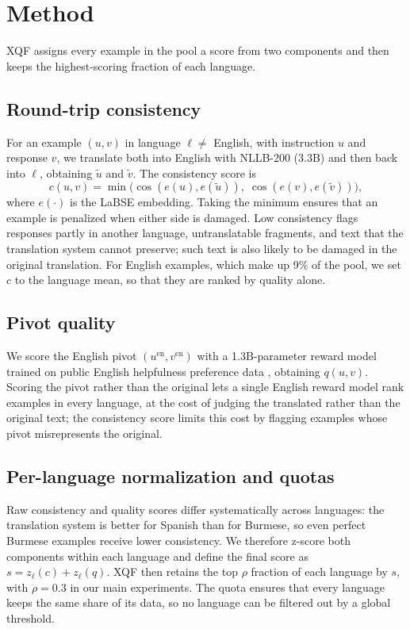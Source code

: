 \documentclass{article}
\begin{document}
\section{Method}
\label{sec:method}

XQF assigns every example in the pool a score from two components and then keeps the highest-scoring fraction of each language.

\subsection{Round-trip consistency}
For an example $(u, v)$ in language $\ell \neq$ English, with instruction $u$ and response $v$, we translate both into English with NLLB-200 (3.3B) and then back into $\ell$, obtaining $\tilde u$ and $\tilde v$. The consistency score is
\begin{equation}
c(u, v) = \min\big(\cos(e(u), e(\tilde u)),\; \cos(e(v), e(\tilde v))\big),
\end{equation}
where $e(\cdot)$ is the LaBSE embedding. Taking the minimum ensures that an example is penalized when either side is damaged. Low consistency flags responses partly in another language, untranslatable fragments, and text that the translation system cannot preserve; such text is also likely to be damaged in the original translation. For English examples, which make up 9\% of the pool, we set $c$ to the language mean, so that they are ranked by quality alone.

\subsection{Pivot quality}
We score the English pivot $(u^{\mathrm{en}}, v^{\mathrm{en}})$ with a 1.3B-parameter reward model trained on public English helpfulness preference data \citep{bai2022hhrlhf}, obtaining $q(u, v)$. Scoring the pivot rather than the original lets a single English reward model rank examples in every language, at the cost of judging the translated rather than the original text; the consistency score limits this cost by flagging examples whose pivot misrepresents the original.

\subsection{Per-language normalization and quotas}
Raw consistency and quality scores differ systematically across languages: the translation system is better for Spanish than for Burmese, so even perfect Burmese examples receive lower consistency. We therefore z-score both components within each language and define the final score as $s = z_\ell(c) + z_\ell(q)$. XQF then retains the top $\rho$ fraction of each language by $s$, with $\rho = 0.3$ in our main experiments. The quota ensures that every language keeps the same share of its data, so no language can be filtered out by a global threshold.
\end{document}

